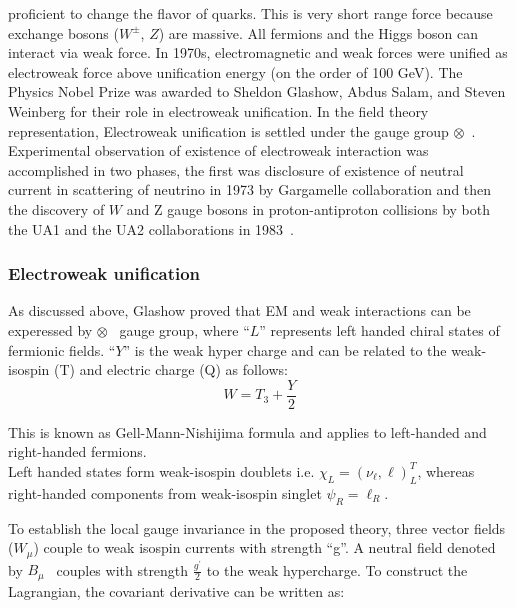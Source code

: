 proficient to change the flavor of quarks. This is very short range force 
because exchange bosons ($W^\pm$, $Z$) are massive. All fermions and the Higgs boson can interact via weak force. In 1970s, electromagnetic and weak
forces were unified as electroweak force above unification energy (on the order of 100 GeV). The Physics Nobel Prize was awarded to Sheldon Glashow, 
Abdus Salam, and Steven Weinberg for their role in electroweak unification. In the field theory representation, Electroweak unification is settled under the gauge group
\sutwol$\otimes$\uoneg~. Experimental observation of existence of electroweak interaction was accomplished in two phases, the first was disclosure of existence of neutral current in scattering  of neutrino in 1973 by Gargamelle collaboration and then the discovery of $W$ and Z gauge bosons in proton-antiproton collisions by both the UA1 and the UA2 
collaborations in 1983~\cite{Reference2,Reference3,Reference4,Reference5}.

\subsubsection{Electroweak unification} \label{ewk_glashow} %

As discussed above, Glashow proved that EM and weak interactions can be experessed by \sutwol$\otimes$\uoneg~ gauge group, where ``$L$'' represents left handed chiral states of fermionic fields.  ``$Y$'' is the weak hyper charge and can be related to the weak-isospin (T) and electric charge (Q) as follows: \\
\begin{equation}
	W = T_{3} + \frac{Y}{2}%
\label{eqn:gmn_formula}
\end{equation}

This is known as Gell-Mann-Nishijima formula and applies to left-handed and right-handed fermions. \\
Left handed states form weak-isospin doublets i.e. $\chi_{L}=(\nu_{\ell}, \ell)^{T}_{L}$, whereas right-handed components from weak-isospin singlet $\psi_{R}=\ell_{R}$.

To establish the local gauge invariance in the proposed theory, three vector fields ($W_{\mu}$) couple to weak isospin currents with strength ``g''. A neutral field denoted by $B_{\mu}$~ couples with strength $\frac{g^{'}}{2}$ to the weak hypercharge. To construct the Lagrangian, the covariant derivative can be written as:\\

